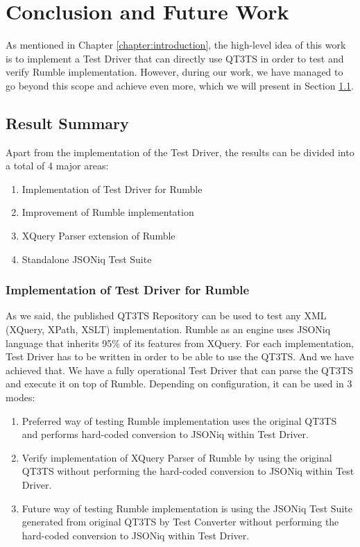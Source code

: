 \chapter{Conclusion and Future Work} 
\label{chapter:conclusions}
As mentioned in Chapter \ref{chapter:introduction}, the high-level idea of this work is to implement a Test Driver that can directly use QT3TS in order to test and verify Rumble implementation. However, during our work, we have managed to go beyond this scope and achieve even more, which we will present in Section \ref{sec:overallsummary}.

\section{Result Summary}
\label{sec:overallsummary}
Apart from the implementation of the Test Driver, the results can be divided into a total of 4 major areas:
\begin{enumerate}
	\item Implementation of Test Driver for Rumble
	\item Improvement of Rumble implementation
	\item XQuery Parser extension of Rumble
	\item Standalone JSONiq Test Suite
\end{enumerate}

\subsection{Implementation of Test Driver for Rumble}
As we said, the published QT3TS Repository \cite{TestSuiteGitHubRepository} can be used to test any XML (XQuery, XPath, XSLT) implementation. Rumble as an engine uses JSONiq language that inherits 95\% of its features from XQuery. For each implementation, Test Driver has to be written in order to be able to use the QT3TS. And we have achieved that. We have a fully operational Test Driver that can parse the QT3TS and execute it on top of Rumble. Depending on configuration, it can be used in 3 modes:
\begin{enumerate}
	\item Preferred way of testing Rumble implementation uses the original QT3TS and performs hard-coded conversion to JSONiq within Test Driver.
	\item  Verify implementation of XQuery Parser of Rumble by using the original QT3TS without performing the hard-coded conversion to JSONiq within Test Driver.
	\item Future way of testing Rumble implementation is using the JSONiq Test Suite generated from original QT3TS by Test Converter without performing the hard-coded conversion to JSONiq within Test Driver.
\end{enumerate} 

